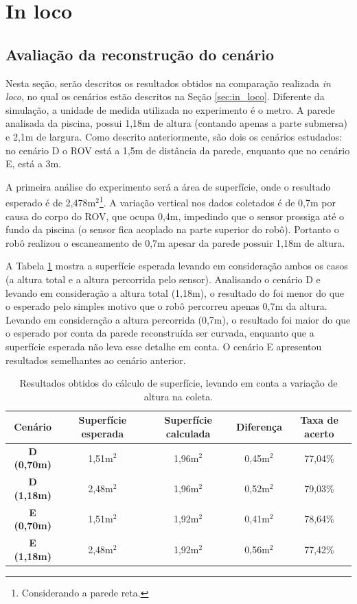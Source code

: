 \section{In loco}

\subsection{Avaliação da reconstrução do cenário}
\label{sec:avaliacao_cenarios_inloco}
Nesta seção, serão descritos os resultados obtidos na comparação realizada \textit{in loco}, no qual os cenários estão descritos na Seção \ref{sec:in_loco}.
Diferente da simulação, a unidade de medida utilizada no experimento é o metro.
A parede analisada da piscina, possui 1,18m de altura (contando apenas a parte submersa) e 2,1m de largura.
Como descrito anteriormente, são dois os cenários estudados: no cenário D o ROV está a 1,5m de distância da parede, enquanto que no cenário E, está a 3m.

A primeira análise do experimento será a área de superfície, onde o resultado esperado é de 2,478m$^2$\footnote{Considerando a parede reta.}.
A variação vertical nos dados coletados é de 0,7m por causa do corpo do ROV, que ocupa 0,4m, impedindo que o sensor prossiga até o fundo da piscina (o sensor fica acoplado na parte superior do robô).
Portanto o robô realizou o escaneamento de 0,7m apesar da parede possuir 1,18m de altura. 

A Tabela \ref{tab:result_inloco_sup} mostra a superfície esperada levando em consideração ambos os casos (a altura total e a altura percorrida pelo sensor).
Analisando o cenário D e levando em consideração a altura total (1,18m), o resultado do foi menor do que o esperado pelo simples motivo que o robô percorreu apenas 0,7m da altura.
Levando em consideração a altura percorrida (0,7m), o resultado foi maior do que o esperado por conta da parede reconstruída ser curvada, enquanto que a superfície esperada não leva esse detalhe em conta.
O cenário E apresentou resultados semelhantes ao cenário anterior.

\begin{table}[H]
    \centering
    \caption{Resultados obtidos do cálculo de superfície, levando em conta a variação de altura na coleta.}
    \begin{tabular}{@{}ccccc@{}}
        \toprule
        \multicolumn{1}{c}{\textbf{Cenário}} & \textbf{Superfície esperada} & \textbf{Superfície calculada} & \textbf{Diferença} & \textbf{Taxa de acerto} \\ \midrule
        \textbf{D (0,70m)} & 1,51m$^2$ & 1,96m$^2$ & 0,45m$^2$ & 77,04\% \\
        \textbf{D (1,18m)} & 2,48m$^2$ & 1,96m$^2$ & 0,52m$^2$ & 79,03\% \\
        \textbf{E (0,70m)} & 1,51m$^2$ & 1,92m$^2$ & 0,41m$^2$ & 78,64\% \\
        \textbf{E (1,18m)} & 2,48m$^2$ & 1,92m$^2$ & 0,56m$^2$ & 77,42\% \\
        \bottomrule
    \end{tabular}
    \label{tab:result_inloco_sup}
\end{table}

